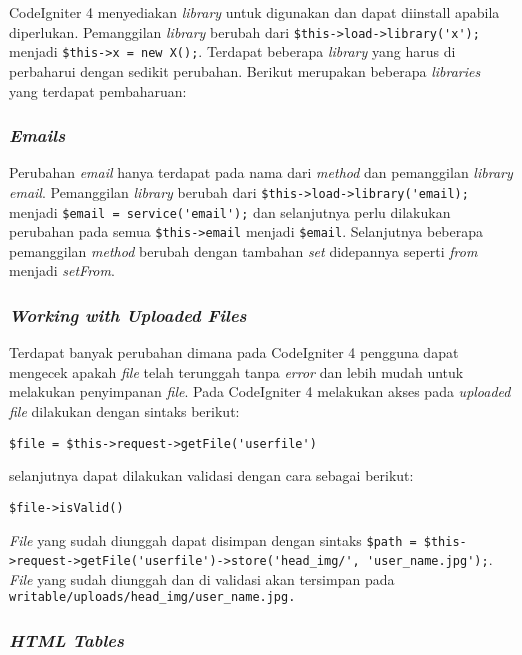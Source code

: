 CodeIgniter 4 menyediakan \textit{library} untuk digunakan dan dapat diinstall apabila diperlukan. Pemanggilan \textit{library} berubah dari \verb|$this->load->library('x');| menjadi \verb|$this->x = new X();|. Terdapat beberapa \textit{library} yang harus di perbaharui dengan sedikit perubahan. Berikut merupakan beberapa \textit{libraries} yang terdapat pembaharuan:

\subsubsection{\textit{Emails}}

Perubahan \textit{email} hanya terdapat pada nama dari \textit{method} dan pemanggilan \textit{library email}. Pemanggilan  \textit{library} berubah dari \verb|$this->load->library('email);| menjadi \verb|$email = service('email');| dan selanjutnya perlu dilakukan perubahan pada semua \verb|$this->email| menjadi \verb|$email|. Selanjutnya beberapa pemanggilan \textit{method} berubah dengan tambahan \textit{set} didepannya seperti \textit{from} menjadi \textit{setFrom}.

\subsubsection{\textit{Working with Uploaded Files}}

Terdapat banyak perubahan dimana pada CodeIgniter 4 pengguna dapat mengecek apakah \textit{file} telah terunggah tanpa \textit{error} dan lebih mudah untuk melakukan penyimpanan \textit{file}. Pada CodeIgniter 4 melakukan akses pada \textit{uploaded file} dilakukan dengan sintaks berikut:
\begin{center}
\verb|$file = $this->request->getFile('userfile')|
\end{center} selanjutnya dapat dilakukan validasi dengan cara sebagai berikut:
\begin{center}
\verb|$file->isValid()|
\end{center} 
\textit{File} yang sudah diunggah dapat disimpan dengan sintaks \verb|$path = $this->request->getFile('userfile')->store('head_img/', 'user_name.jpg');|. \textit{File} yang sudah diunggah dan di validasi akan tersimpan pada \verb|writable/uploads/head_img/user_name.jpg.|

\subsubsection{\textit{HTML Tables}}

